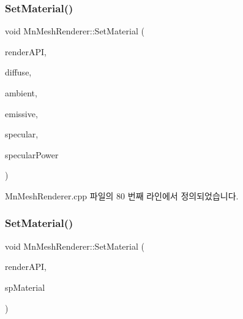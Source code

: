 \mbox{\label{class_m_n_l_1_1_mn_mesh_renderer_ab7ba671fa8776fcd1b8b0de20d7b2f13}} 
\subsubsection{\texorpdfstring{Set\+Material()}{SetMaterial()}\hspace{0.1cm}{\footnotesize\ttfamily [1/2]}}
{\footnotesize\ttfamily void Mn\+Mesh\+Renderer\+::\+Set\+Material (\begin{DoxyParamCaption}\item[{\hyperlink{class_m_n_l_1_1_mn_render_a_p_i}{Mn\+Render\+A\+PI} \&}]{render\+A\+PI,  }\item[{const Direct\+X\+::\+Simple\+Math\+::\+Vector4 \&}]{diffuse,  }\item[{const Direct\+X\+::\+Simple\+Math\+::\+Vector4 \&}]{ambient,  }\item[{const Direct\+X\+::\+Simple\+Math\+::\+Vector4 \&}]{emissive,  }\item[{const Direct\+X\+::\+Simple\+Math\+::\+Vector4 \&}]{specular,  }\item[{float}]{specular\+Power }\end{DoxyParamCaption})}



Mn\+Mesh\+Renderer.\+cpp 파일의 80 번째 라인에서 정의되었습니다.

\mbox{\label{class_m_n_l_1_1_mn_mesh_renderer_a436b493676e8a9fbc93486a46f6fc58f}} 
\subsubsection{\texorpdfstring{Set\+Material()}{SetMaterial()}\hspace{0.1cm}{\footnotesize\ttfamily [2/2]}}
{\footnotesize\ttfamily void Mn\+Mesh\+Renderer\+::\+Set\+Material (\begin{DoxyParamCaption}\item[{\hyperlink{class_m_n_l_1_1_mn_render_a_p_i}{Mn\+Render\+A\+PI} \&}]{render\+A\+PI,  }\item[{const std\+::shared\+\_\+ptr$<$ \hyperlink{class_m_n_l_1_1_mn_material}{Mn\+Material} $>$}]{sp\+Material }\end{DoxyParamCaption})}



